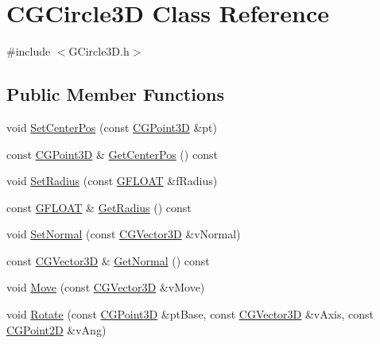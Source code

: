 \hypertarget{class_c_g_circle3_d}{}\section{C\+G\+Circle3\+D Class Reference}
\label{class_c_g_circle3_d}


{\ttfamily \#include $<$G\+Circle3\+D.\+h$>$}

\subsection*{Public Member Functions}
\begin{DoxyCompactItemize}
\item 
void \hyperlink{class_c_g_circle3_d_a92082931597a39aeab599b0b5324544c}{Set\+Center\+Pos} (const \hyperlink{class_c_g_point3_d}{C\+G\+Point3\+D} \&pt)
\item 
const \hyperlink{class_c_g_point3_d}{C\+G\+Point3\+D} \& \hyperlink{class_c_g_circle3_d_aa13b4ea38598ce20753a6c7f24beaf97}{Get\+Center\+Pos} () const 
\item 
void \hyperlink{class_c_g_circle3_d_aec149867819acfb900f97a2e0ab8464a}{Set\+Radius} (const \hyperlink{_g_types_8h_abf6eba8223df62f199b811a6c52ff2ef}{G\+F\+L\+O\+A\+T} \&f\+Radius)
\item 
const \hyperlink{_g_types_8h_abf6eba8223df62f199b811a6c52ff2ef}{G\+F\+L\+O\+A\+T} \& \hyperlink{class_c_g_circle3_d_aef654aa8121847ccf2485e2a82a5aff7}{Get\+Radius} () const 
\item 
void \hyperlink{class_c_g_circle3_d_a8114c3f14564dfb664ec17a970c675f3}{Set\+Normal} (const \hyperlink{_g_point3_d_8h_aa7e73d39f4c991acb5a13c84b498366d}{C\+G\+Vector3\+D} \&v\+Normal)
\item 
const \hyperlink{_g_point3_d_8h_aa7e73d39f4c991acb5a13c84b498366d}{C\+G\+Vector3\+D} \& \hyperlink{class_c_g_circle3_d_a64cec98e6859a40fb52a0762bfa108e8}{Get\+Normal} () const 
\item 
void \hyperlink{class_c_g_circle3_d_aec6466a9b996dd1e6b8bba349d2423c0}{Move} (const \hyperlink{_g_point3_d_8h_aa7e73d39f4c991acb5a13c84b498366d}{C\+G\+Vector3\+D} \&v\+Move)
\item 
void \hyperlink{class_c_g_circle3_d_a54ee2622141434df021f5ea99dfae0da}{Rotate} (const \hyperlink{class_c_g_point3_d}{C\+G\+Point3\+D} \&pt\+Base, const \hyperlink{_g_point3_d_8h_aa7e73d39f4c991acb5a13c84b498366d}{C\+G\+Vector3\+D} \&v\+Axis, const \hyperlink{class_c_g_point2_d}{C\+G\+Point2\+D} \&v\+Ang)
\item 

\end{DoxyCompactItemize}
